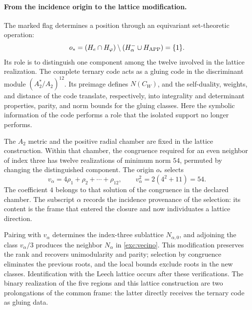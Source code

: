 \paragraph{From the incidence origin to the lattice modification.}
\label{inc-ampl-reticulo}
The marked flag determines a position through an equivariant set-theoretic
operation:
\[
 o_*=(H_e\cap H_\varphi)
       \setminus(H^-_\alpha\cup H_{\rm APP})=\{1\}.
\]
Its role is to distinguish one component among the twelve involved in the
lattice realization. The complete ternary code acts as a gluing code in the
discriminant module $(A_2^*/A_2)^{12}$. Its preimage defines $N(C_W)$, and
the self-duality, weights, and distance of the code translate, respectively,
into integrality and determinant properties, parity, and norm bounds for the
gluing classes. Here the symbolic information of the code performs a role
that the isolated support no longer performs.

The $A_2$ metric and the positive radial chamber are fixed in the lattice
construction. Within that chamber, the congruence required for an even
neighbor of index three has twelve realizations of minimum norm $54$,
permuted by changing the distinguished component. The origin $o_*$ selects
\[
 v_\alpha=4\rho_1+\rho_2+\cdots+\rho_{12},\qquad
 v_\alpha^2=2(4^2+11)=54.
\]
The coefficient $4$ belongs to that solution of the congruence in the
declared chamber. The subscript $\alpha$ records the incidence provenance of
the selection: its content is the frame that entered the closure and now
individuates a lattice direction.

Pairing with $v_\alpha$ determines the index-three sublattice
$N_{\alpha,0}$, and adjoining the class $v_\alpha/3$ produces the neighbor
$N_\alpha$ in \eqref{exc:vecino}. This modification preserves the rank and
recovers unimodularity and parity; selection by congruence eliminates the
previous roots, and the local bounds exclude roots in the new classes.
Identification with the Leech lattice occurs after these verifications. The
binary realization of the five regions and this lattice construction are two
prolongations of the common frame: the latter directly receives the ternary
code as gluing data.
